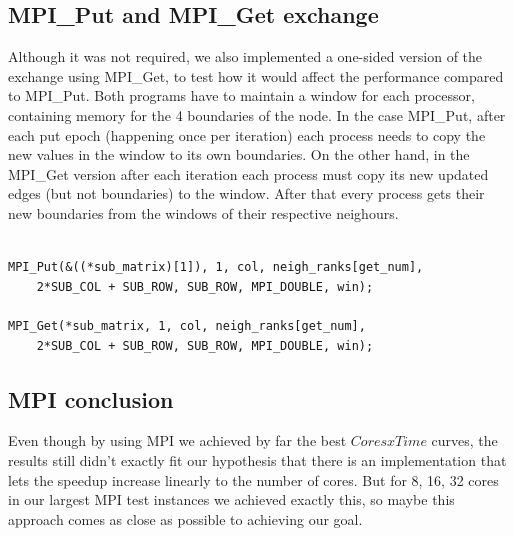 \documentclass[11pt]{article}
\begin{document}
\subsection{MPI\_Put and MPI\_Get exchange}
Although it was not required, we also implemented a one-sided version of the exchange using MPI\_Get, to test how it would affect the performance 
compared to MPI\_Put. Both programs have to maintain a window for each processor, containing memory for the 4 boundaries of the node. In the case
MPI\_Put, after each put epoch (happening once per iteration) each process needs to copy the new values in the window to its own boundaries. On the
other hand, in the MPI\_Get version after each iteration each process must copy its new updated edges (but not boundaries) to the window. After that
every process gets their new boundaries from the windows of their respective neighours.
\begin{lstlisting}[label=some-code, caption=Left MPI\_Put vs left MPI\_Get call]
      
MPI_Put(&((*sub_matrix)[1]), 1, col, neigh_ranks[get_num], 
    2*SUB_COL + SUB_ROW, SUB_ROW, MPI_DOUBLE, win);

MPI_Get(*sub_matrix, 1, col, neigh_ranks[get_num], 
    2*SUB_COL + SUB_ROW, SUB_ROW, MPI_DOUBLE, win);

\end{lstlisting}

\subsection{MPI conclusion} 
Even though by using MPI we achieved by far the best $Cores x Time$ curves, the results still didn't exactly fit our hypothesis that there is an implementation that
lets the speedup increase linearly to the number of cores. But for 8, 16, 32 cores in our largest MPI test instances we achieved exactly this, so maybe this approach
comes as close as possible to achieving our goal.
\end{document}
